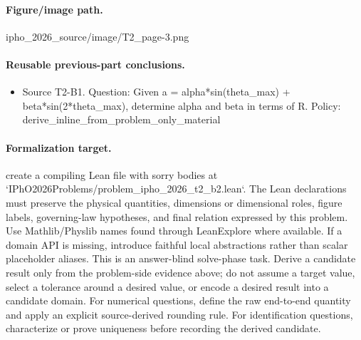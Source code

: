 \paragraph{Figure/image path.}
ipho\_2026\_source/image/T2\_page-3.png

\paragraph{Reusable previous-part conclusions.}
\begin{itemize}
\item Source T2-B1. Question: Given a = alpha*sin(theta\_max) + beta*sin(2*theta\_max), determine alpha and beta in terms of R. Policy: derive\_inline\_from\_problem\_only\_material
\end{itemize}

\paragraph{Formalization target.}
create a compiling Lean file with sorry bodies at `IPhO2026Problems/problem\_ipho\_2026\_t2\_b2.lean`.
The Lean declarations must preserve the physical quantities, dimensions or dimensional roles, figure labels, governing-law hypotheses, and final relation expressed by this problem.
Use Mathlib/Physlib names found through LeanExplore where available. If a domain API is missing, introduce faithful local abstractions rather than scalar placeholder aliases.
This is an answer-blind solve-phase task. Derive a candidate result only from the problem-side evidence above; do not assume a target value, select a tolerance around a desired value, or encode a desired result into a candidate domain.
For numerical questions, define the raw end-to-end quantity and apply an explicit source-derived rounding rule. For identification questions, characterize or prove uniqueness before recording the derived candidate.

